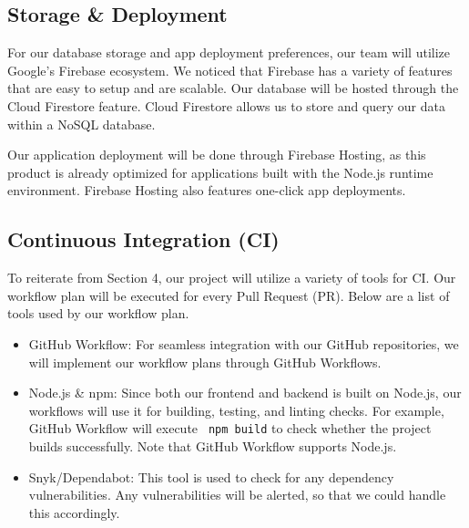 \documentclass{article}
\begin{document}
\subsection{Storage \& Deployment}
For our database storage and app deployment preferences, our team will utilize Google's Firebase ecosystem. We noticed that Firebase has a variety of features that are easy to setup and are scalable. Our database will be hosted through the Cloud Firestore feature. Cloud Firestore allows us to store and query our data within a NoSQL database. 

Our application deployment will be done through Firebase Hosting, as this product is already optimized for applications built with the Node.js runtime environment. Firebase Hosting also features one-click app deployments.

\subsection{Continuous Integration (CI)}
To reiterate from Section 4, our project will utilize a variety of tools for CI. Our workflow plan will be executed for every Pull Request (PR). Below are a list of tools used by our workflow plan.
\begin{itemize}
	\item GitHub Workflow: For seamless integration with our GitHub repositories, we will implement our workflow plans through GitHub Workflows.  
	\item Node.js \& npm: Since both our frontend and backend is built on Node.js, our workflows will use it for building, testing, and linting checks. For example, GitHub Workflow will execute \verb| npm build| to check whether the project builds successfully. Note that GitHub Workflow supports Node.js.
	\item Snyk/Dependabot: This tool is used to check for any dependency vulnerabilities. Any vulnerabilities will be alerted, so that we could handle this accordingly.
\end{itemize}
\end{document}
